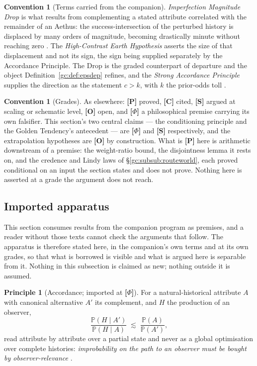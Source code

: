 \documentclass[11pt]{article}
\numberwithin{equation}{section}
\theoremstyle{plain}
\theoremstyle{definition}
\newtheorem{convention}[theorem]{Convention}
\newtheorem{principle}{Principle}
\theoremstyle{remark}
\newcommand{\PP}{\mathbb{P}}
\begin{document}
\begin{convention}[Terms carried from the companion]
\emph{Imperfection Magnitude Drop} is what results from complementing a
stated attribute correlated with the remainder of an Aethus: the
success-intersection of the perturbed history is displaced by many
orders of magnitude, becoming drastically minute without reaching zero
\cite[\S IMD]{Nexus}. The \emph{High-Contrast Earth Hypothesis} asserts
the size of that displacement and not its sign, the sign being supplied
separately by the Accordance Principle. The Drop is the graded
counterpart of departure and the object Definition~\ref{gc:def:epsdep}
refines, and the \emph{Strong Accordance Principle} supplies the
direction as the statement $c>k$, with $k$ the prior-odds toll
\cite{Ben26Optimal}.
\end{convention}

\begin{convention}[Grades]\label{gc:conv:grades}
As elsewhere: \textbf{[P]} proved, \textbf{[C]} cited, \textbf{[S]}
argued at scaling or schematic level, \textbf{[O]} open, and
\textbf{[$\Phi$]} a philosophical premise carrying its own falsifier.
This section's two central claims --- the conditioning principle and the
Golden Tendency's antecedent --- are \textbf{[$\Phi$]} and \textbf{[S]}
respectively, and the extrapolation hypotheses are \textbf{[O]} by
construction. What is \textbf{[P]} here is arithmetic downstream of a
premise: the weight-ratio bound, the disjointness lemma it rests on, and
the credence and Lindy laws of \S\ref{gc:subsub:routeworld}, each proved
conditional on an input the section states and does not prove. Nothing
here is asserted at a grade the argument does not reach.
\end{convention}

\subsection{Imported apparatus}\label{gc:sub:imported}

This section consumes results from the companion program as premises,
and a reader without those texts cannot check the arguments that follow.
The apparatus is therefore stated here, in the companion's own terms and
at its own grades, so that what is borrowed is visible and what is
argued here is separable from it. Nothing in this subsection is claimed
as new; nothing outside it is assumed.

\begin{principle}[Accordance; imported at \textbf{[$\Phi$]}]
\label{gc:prin:accordance}
For a natural-historical attribute $A$ with canonical alternative $A'$
its complement, and $H$ the production of an observer,
\begin{equation}\label{gc:eq:accordance}
\frac{\PP(H\mid A')}{\PP(H\mid A)}\;\lesssim\;\frac{\PP(A)}{\PP(A')},
\end{equation}
read attribute by attribute over a partial state and never as a global
optimisation over complete histories: \emph{improbability on the path to
an observer must be bought by observer-relevance}
\cite{Nexus, NexicFoundation}.
\end{principle}
\end{document}
